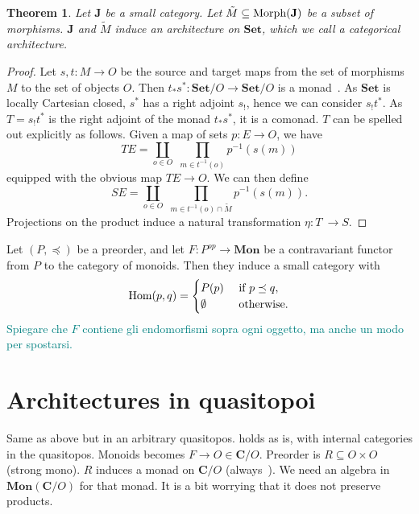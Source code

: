 \documentclass[12pt]{article}
\newtheorem{theorem}{Theorem}
\newcommand{\pietro}[1]{\textcolor{teal}{#1}}
\newcommand{\Hom}{{\textnormal{Hom}}}
\newcommand{\Morph}{{\textnormal{Morph}}}
\newcommand{\Set}{{\mathbf{Set}}}
\newcommand{\Mon}{{\mathbf{Mon}}}
\newcommand{\Cat}{{\mathbf{C}}}
\newcommand{\JCat}{{\mathbf{J}}}
\begin{document}
\begin{theorem}\label{thm:categorical_architecture}
    Let $\JCat$ be a small category. Let $\tilde M \subseteq \Morph(\JCat)$ be a subset of morphisms. $\JCat$ and $\tilde M$ induce an architecture on $\Set$, which we call a {\em categorical architecture}. 
\end{theorem}

\begin{proof}
    Let $s, t\colon M \rightarrow O$ be the source and target maps from the set of morphisms $M$ to the set of objects $O$. Then $t_*s^*\colon \Set/O \rightarrow \Set/O$ is a monad~\cite[Thm.~V.8.2]{Mac_Lane_1994}. As $\Set$ is locally Cartesian closed, $s^*$ has a right adjoint $s_!$, hence we can consider $s_!t^*$. As $T = s_!t^*$ is the right adjoint of the monad $t_*s^*$, it is a comonad. $T$ can be spelled out explicitly as follows. Given a map of sets $p\colon E \rightarrow O$, we have
    \begin{equation*}
        TE = \coprod_{o \in O} \, \, \prod_{m \in t^{-1}(o)} p^{-1}(s(m))
    \end{equation*}
    equipped with the obvious map $TE \rightarrow O$.
    We can then define
    \begin{equation*}
        SE = \coprod_{o \in O} \, \, \prod_{m \in t^{-1}(o)\cap \tilde M} p^{-1}(s(m)).
    \end{equation*}
    Projections on the product induce a natural transformation $\eta\colon T\ \rightarrow S$.
\end{proof}

Let $(P, \preceq)$ be a preorder, and let $F\colon P^{op} \rightarrow \Mon$ be a contravariant functor from $P$ to the category of monoids. Then they induce a small category with
\begin{equation*}
    \Hom(p, q) = \begin{cases}
        P(p) &\text{ if } p \preceq q,\\
        \emptyset &\text{ otherwise.}
    \end{cases}
\end{equation*}
\pietro{Spiegare che $F$ contiene gli endomorfismi sopra ogni oggetto, ma anche un modo per spostarsi.}

\section{Architectures in quasitopoi}

Same as above but in an arbitrary quasitopos.
 holds as is, with internal categories in the quasitopos. Monoids becomes $F \rightarrow O \in \Cat/O$. Preorder is $R \subseteq O \times O$ (strong mono). $R$ induces a monad on $\Cat/O$ (always~\cite[Thm.~V.8.2]{Mac_Lane_1994}). We need an algebra in $\Mon(\Cat/O)$ for that monad. It is a bit worrying that it does not preserve products.
\end{document}
